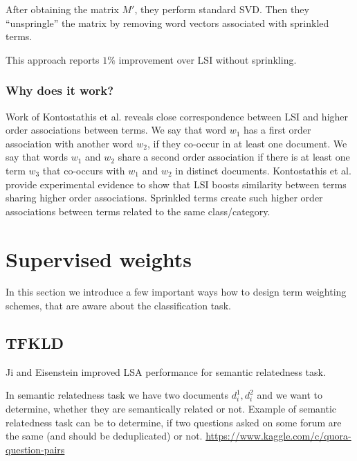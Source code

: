     After obtaining the matrix $M'$, they perform standard SVD. 
    Then they ``unspringle'' the matrix by removing word vectors associated with sprinkled terms.
    
    This approach reports $1\%$ improvement over LSI without sprinkling.
    
    \subsubsection{Why does it work?}
    Work of Kontostathis et al. \cite{kontostathis2006framework} reveals close correspondence between LSI and higher order associations between terms. 
    We say that word $w_1$ has a first order association with another word $w_2$, if they co-occur in at least one document. 
    We say that words $w_1$ and $w_2$ share a second order association if there is at least one term $w_3$ that co-occurs with $w_1$ and $w_2$ in distinct documents. 
    Kontostathis et al. provide experimental evidence to show that LSI boosts similarity between terms sharing higher order associations. 
    Sprinkled terms create such higher order associations between terms related to  the same class/category.
        
\section{Supervised weights} \label{sec:supervised:weights}
    
    In this section we introduce a few important ways how to design term weighting schemes, that are aware about the classification task.
    
    \* %
    
    \subsection{TFKLD}
        Ji and Eisenstein \cite{ji2013discriminative} %
        improved LSA performance for semantic relatedness task.
        
        In semantic relatedness task we have two documents $d_i^1, d_i^2$ and we want to determine, whether they are semantically related or not. 
        Example of semantic relatedness task can be to determine, if two questions asked on some forum are the same (and should be deduplicated) or not.
        \url{https://www.kaggle.com/c/quora-question-pairs}
        
